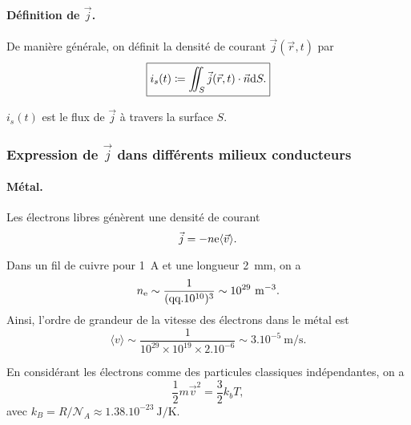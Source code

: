             \paragraph{Définition de $\vec{j}$.}

                De manière générale, on définit la densité de courant $\vec{j}(\vec{r},t)$ par 
                \begin{equation*}
                    \boxed{
                        i_s(t)\coloneqq\iint_{S}\vec{j}(\vec{r},t)\cdot\vec{n}\mathrm{d} S.
                    }
                \end{equation*}

                $i_s(t)$ est le flux de $\vec{j}$ à travers la surface $S$.

        \subsubsection{Expression de $\vec{j}$ dans différents milieux conducteurs}

            \paragraph{Métal.} 
            
                Les électrons libres génèrent une densité de courant 
                \begin{equation*}
                    \vec{j}=-n\mathrm{e} \langle \vec{v}\rangle.
                \end{equation*}

                Dans un fil de cuivre pour 1~\si{\ampere} et une longueur 2~\si{\milli\metre}, on a 
                \begin{equation*}
                    n_{\mathrm{e}}\sim\frac{1}{(\text{qq}.10^{10})^{3}}\sim 10^{29}~\si{\per\metre\cubed}.
                \end{equation*}
                Ainsi, l'ordre de grandeur de la vitesse des électrons dans le métal est 
                \begin{equation*}
                    \langle v\rangle \sim \frac{1}{10^{29}\times10^{19}\times 2.10^{-6}}\sim3.10^{-5}~\si{\metre\per\second}.
                \end{equation*}

                En considérant les électrons comme des particules classiques indépendantes, on a 
                \begin{equation*}
                    \frac{1}{2}m\vec{v}^{2}=\frac{3}{2}k_b T,
                \end{equation*}
                avec $k_B=R/\mathcal{N}_A\approx 1.38.10^{-23}~\si{\joule\per\kelvin}$.

